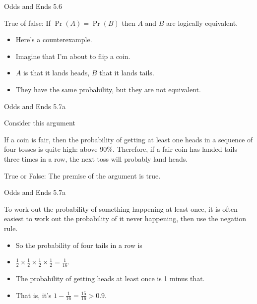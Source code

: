 \documentclass[
  ignorenonframetext,
]{beamer}
\providecommand{\tightlist}{%
  \setlength{\itemsep}{0pt}\setlength{\parskip}{0pt}}
\renewcommand{\,}{\text{, }}
\renewenvironment*{quote}	
	{\list{}{\rightmargin   \leftmargin} \item } 	
	{\endlist }
\begin{document}
\begin{frame}{Odds and Ends 5.6}
\protect\hypertarget{odds-and-ends-5.6}{}

True of false: If \(\Pr(A) = \Pr(B)\) then \(A\) and \(B\) are logically
equivalent. \pause

\begin{itemize}
\tightlist
\item
  Here's a counterexample.
\item
  Imagine that I'm about to flip a coin.
\item
  \(A\) is that it lands heads, \(B\) that it lands tails.
\item
  They have the same probability, but they are not equivalent.
\end{itemize}

\end{frame}

\begin{frame}{Odds and Ends 5.7a}
\protect\hypertarget{odds-and-ends-5.7a}{}

Consider this argument

\begin{quote}
If a coin is fair, then the probability of getting at least one heads in
a sequence of four tosses is quite high: above 90\%. Therefore, if a
fair coin has landed tails three times in a row, the next toss will
probably land heads.
\end{quote}

True or False: The premise of the argument is true.

\end{frame}

\begin{frame}{Odds and Ends 5.7a}
\protect\hypertarget{odds-and-ends-5.7a-1}{}

To work out the probability of something happening at least once, it is
often easiest to work out the probability of it never happening, then
use the negation rule.

\begin{itemize}
\tightlist
\item
  So the probability of four tails in a row is
\item
  \(\frac{1}{2} \times \frac{1}{2} \times \frac{1}{2} \times \frac{1}{2} = \frac{1}{16}\).
\item
  The probability of getting heads at least once is 1 minus that.
\item
  That is, it's \(1 - \frac{1}{16} = \frac{15}{16} > 0.9\).
\end{itemize}

\end{frame}
\end{document}
